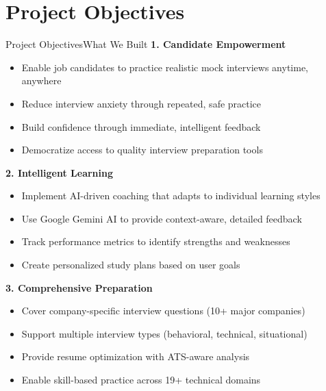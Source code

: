 \documentclass{beamer}
\begin{document}
\section{Project Objectives}
\begin{frame}{Project Objectives}{What We Built}
\textbf{1. Candidate Empowerment}
\begin{itemize}
    \item Enable job candidates to practice realistic mock interviews anytime, anywhere
    \item Reduce interview anxiety through repeated, safe practice
    \item Build confidence through immediate, intelligent feedback
    \item Democratize access to quality interview preparation tools
\end{itemize}

\textbf{2. Intelligent Learning}
\begin{itemize}
    \item Implement AI-driven coaching that adapts to individual learning styles
    \item Use Google Gemini AI to provide context-aware, detailed feedback
    \item Track performance metrics to identify strengths and weaknesses
    \item Create personalized study plans based on user goals
\end{itemize}

\textbf{3. Comprehensive Preparation}
\begin{itemize}
    \item Cover company-specific interview questions (10+ major companies)
    \item Support multiple interview types (behavioral, technical, situational)
    \item Provide resume optimization with ATS-aware analysis
    \item Enable skill-based practice across 19+ technical domains
\end{itemize}
\end{frame}
\end{document}
